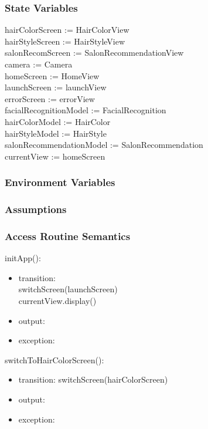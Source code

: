 \documentclass[12pt, titlepage]{article}
\begin{document}
\subsubsection{State Variables}
hairColorScreen := HairColorView \\
hairStyleScreen := HairStyleView \\
salonRecomScreen := SalonRecommendationView \\
camera := Camera \\
homeScreen := HomeView \\
launchScreen := launchView \\
errorScreen := errorView \\
facialRecognitionModel := FacialRecognition \\
hairColorModel := HairColor \\
hairStyleModel := HairStyle \\
salonRecommendationModel := SalonRecommendation \\
currentView := homeScreen

\subsubsection{Environment Variables}

\subsubsection{Assumptions}

\subsubsection{Access Routine Semantics}

\noindent initApp():
\begin{itemize}
\item transition: \\
switchScreen(launchScreen) \\
currentView.display()
\item output: 
\item exception:
\end{itemize}

\noindent switchToHairColorScreen():
\begin{itemize}
\item transition: switchScreen(hairColorScreen) 
\item output:
\item exception:
\end{itemize}
\end{document}
